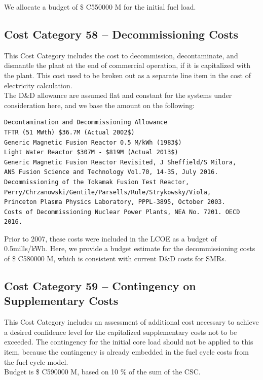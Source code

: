 We allocate a budget of \$ C550000 M for the initial fuel load.

\subsection*{Cost Category 58 – Decommissioning Costs}
This Cost Category includes the cost to decommission, decontaminate, and dismantle the plant at the end of commercial operation, if it is capitalized with the plant.  This cost used to be broken out as a separate line item in the cost of electricity calculation.\\

The D\&D allowance are assumed flat and constant for the systems under consideration here, and we base the amount on the following:

\begin{verbatim} 
Decontamination and Decommissioning Allowance 
TFTR (51 MWth) $36.7M (Actual 2002$) 
Generic Magnetic Fusion Reactor 0.5 M/kWh (1983$) 
Light Water Reactor $307M - $819M (Actual 2013$) 
Generic Magnetic Fusion Reactor Revisited, J Sheffield/S Milora,  
ANS Fusion Science and Technology Vol.70, 14-35, July 2016. 
Decommissioning of the Tokamak Fusion Test Reactor,
Perry/Chrzanowski/Gentile/Parsells/Rule/Strykowsky/Viola, 
Princeton Plasma Physics Laboratory, PPPL-3895, October 2003.
Costs of Decommissioning Nuclear Power Plants, NEA No. 7201. OECD 2016.
\end{verbatim}

Prior to 2007, these costs were included in the LCOE as a budget of 0.5mills/kWh.  Here, we provide a budget estimate for the decommissioning costs of \$ C580000 M, which is consistent with current D\&D costs for SMRs.

\subsection*{Cost Category 59 – Contingency on Supplementary Costs}
This Cost Category includes an assessment of additional cost necessary to achieve a desired confidence level for the capitalized supplementary costs not to be exceeded. The contingency for the initial core load should not be applied to this item, because the contingency is already embedded in the fuel cycle costs from the fuel cycle model.\\

Budget is \$ C590000 M, based on 10 \% of the sum of the CSC.
